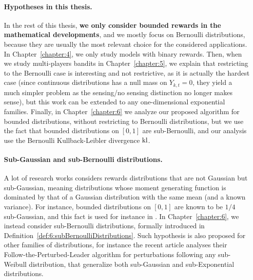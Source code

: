 \paragraph{Hypotheses in this thesis.}
%
In the rest of this thesis, \textbf{we only consider bounded rewards in the mathematical developments}, and we mostly focus on Bernoulli distributions, because they are usually the most relevant choice for the considered applications.
In Chapter~\ref{chapter:4}, we only study models with binary rewards.
%
Then, when we study multi-players bandits in Chapter~\ref{chapter:5}, we explain that restricting to the Bernoulli case is interesting and not restrictive, as it is actually the hardest case (since continuous distributions has a null mass on $Y_{k,t}=0$, they yield a much simpler problem as the sensing/no sensing distinction no longer makes sense), but this work can be extended to any one-dimensional exponential families.
%
Finally, in Chapter~\ref{chapter:6} we analyze our proposed algorithm for bounded distributions, without restricting to Bernoulli distributions, but we use the fact that bounded distributions on $[0,1]$ are sub-Bernoulli, and our analysis use the Bernoulli Kullback-Leibler divergence $\mathrm{kl}$.


\paragraph{Sub-Gaussian and sub-Bernoulli distributions.}
%
A lot of research works considers rewards distributions that are not Gaussian but sub-Gaussian,
meaning distributions whose moment generating function is dominated by that of a Gaussian distribution with the same mean (and a known variance).
For instance, bounded distributions on $[0,1]$ are known to be $1/4$ sub-Gaussian, and this fact is used for instance in \cite{Maillard2018GLR}.
In Chapter~\ref{chapter:6}, we instead consider sub-Bernoulli distributions, formally introduced in Definition~\ref{def:6:subBernoulliDistributions}.
%
Such hypothesis is also proposed for other families of distributions, for instance the recent article \cite{KimTewari2019} analyses their Follow-the-Perturbed-Leader algorithm for perturbations following any sub-Weibull distribution, that generalize both sub-Gaussian and sub-Exponential distributions.



